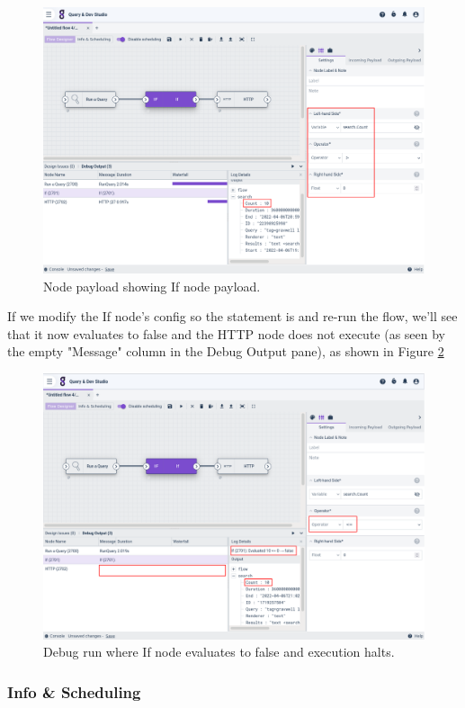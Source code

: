\begin{figure}
	\includegraphics[width=0.85\linewidth]{images/if-payload.png}
	\caption{Node payload showing If node payload.}
	\label{fig:if-payload}
\end{figure}

If we modify the If node's config so the statement is  and re-run the flow, we'll see that it now evaluates to false and the HTTP node does not execute (as seen by the empty "Message" column in the Debug Output pane), as shown in Figure \ref{fig:if-false}

\begin{figure}
	\includegraphics[width=0.85\linewidth]{images/if-false.png}
	\caption{Debug run where If node evaluates to false and execution halts.}
	\label{fig:if-false}
\end{figure}

\subsubsection{Info \& Scheduling}

